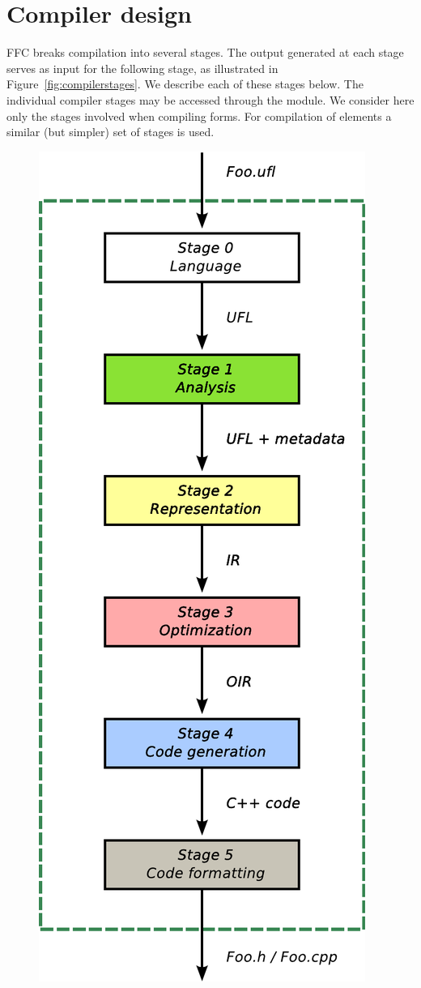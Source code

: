 \section{Compiler design}

FFC breaks compilation into several stages. The output
generated at each stage serves as input for the following stage, as
illustrated in Figure~\ref{fig:compilerstages}. We describe each of
these stages below. The individual compiler stages may be accessed
through the  module. We consider here only the
stages involved when compiling forms. For compilation of elements a
similar (but simpler) set of stages is used.

\begin{figure}
  \begin{center}
    \includegraphics[height=0.8\textheight]{chapters/logg-1/pdf/compilerdesign.pdf}

\end{center}
\end{figure}
